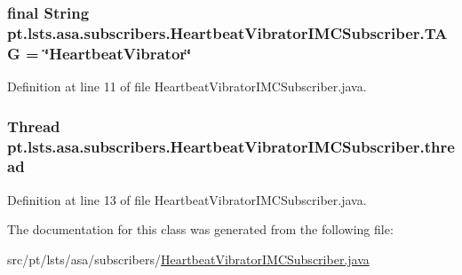 \subsubsection[{T\+A\+G}]{\setlength{\rightskip}{0pt plus 5cm}final String pt.\+lsts.\+asa.\+subscribers.\+Heartbeat\+Vibrator\+I\+M\+C\+Subscriber.\+T\+A\+G = \char`\"{}Heartbeat\+Vibrator\char`\"{}\hspace{0.3cm}{\ttfamily [static]}}\label{classpt_1_1lsts_1_1asa_1_1subscribers_1_1HeartbeatVibratorIMCSubscriber_ae15a436e06007ae060a70852ed1b4ee4}


Definition at line 11 of file Heartbeat\+Vibrator\+I\+M\+C\+Subscriber.\+java.

\hypertarget{classpt_1_1lsts_1_1asa_1_1subscribers_1_1HeartbeatVibratorIMCSubscriber_a5a62cedac61d07d602b602ca28023cbf}{}
\subsubsection[{thread}]{\setlength{\rightskip}{0pt plus 5cm}Thread pt.\+lsts.\+asa.\+subscribers.\+Heartbeat\+Vibrator\+I\+M\+C\+Subscriber.\+thread\hspace{0.3cm}{\ttfamily [private]}}\label{classpt_1_1lsts_1_1asa_1_1subscribers_1_1HeartbeatVibratorIMCSubscriber_a5a62cedac61d07d602b602ca28023cbf}


Definition at line 13 of file Heartbeat\+Vibrator\+I\+M\+C\+Subscriber.\+java.



The documentation for this class was generated from the following file\+:\begin{DoxyCompactItemize}
\item 
src/pt/lsts/asa/subscribers/\hyperlink{HeartbeatVibratorIMCSubscriber_8java}{Heartbeat\+Vibrator\+I\+M\+C\+Subscriber.\+java}\end{DoxyCompactItemize}
